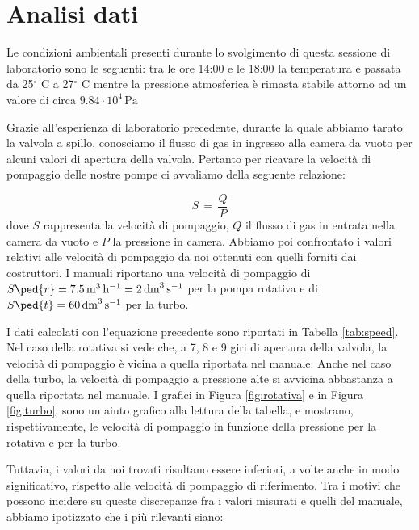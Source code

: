 \section{Analisi dati}

Le condizioni ambientali presenti durante lo svolgimento di questa sessione di laboratorio sono le seguenti:
tra le ore 14:00 e le 18:00 la temperatura e passata da 25$^\circ$ C a 27$^\circ$ C mentre la pressione atmosferica
è rimasta stabile attorno ad un valore di circa $9.84 \cdot 10^4\, \si{\Pa}$

Grazie all'esperienza di laboratorio precedente, durante la quale abbiamo tarato la valvola a spillo,
conosciamo il flusso di gas in ingresso alla camera da vuoto per alcuni valori di apertura della valvola.
Pertanto per ricavare la velocità di pompaggio delle nostre pompe ci avvaliamo della seguente relazione:

\begin{equation}
	S \,=\, \frac{Q}{P}
\end{equation}
%
dove $S$ rappresenta la velocità di pompaggio, $Q$ il flusso di gas in entrata nella camera da vuoto e $P$ la pressione in camera.
Abbiamo poi confrontato i valori relativi alle velocità di pompaggio da noi ottenuti con quelli forniti dai costruttori.
I manuali riportano una velocità di pompaggio di $S\ped{r} = \SI{7.5}{\cubic\metre\per\hour} = \SI{2}{\cubic\deci\metre\per\second}$
per la pompa rotativa e di $S\ped{t} = \SI{60}{\cubic\deci\metre\per\second}$ per la turbo.

I dati calcolati con l'equazione precedente sono riportati in Tabella \ref{tab:speed}.
Nel caso della rotativa si vede che, a 7, 8 e 9 giri di apertura della valvola, la velocità di pompaggio è vicina a quella riportata
nel manuale. Anche nel caso della turbo, la velocità di pompaggio a pressione alte si avvicina abbastanza a quella riportata nel manuale.
I grafici in Figura \ref{fig:rotativa} e in Figura \ref{fig:turbo}, sono un aiuto grafico alla lettura della tabella, e mostrano,
rispettivamente, le velocità di pompaggio in funzione della pressione per la rotativa e per la turbo.

Tuttavia, i valori da noi trovati risultano essere inferiori, a volte anche in modo significativo,
rispetto alle velocità di pompaggio di riferimento. Tra i motivi che possono incidere su
queste discrepanze fra i valori misurati e quelli del manuale, abbiamo ipotizzato che i più rilevanti siano:



